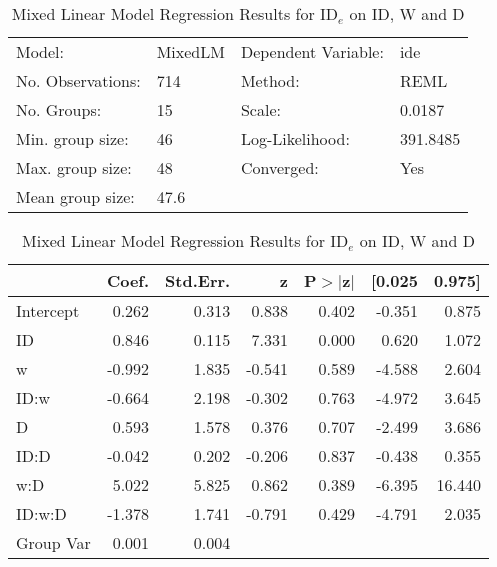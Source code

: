 \documentclass{article}
\begin{document}
\begin{table}
	\caption{Mixed Linear Model Regression Results for ID$_e$ on ID, W and D}
	\label{tab:fit_jgp_ide_id_full}
	\begin{center}
		\begin{tabular}{llll}
			\hline
			Model:            & MixedLM & Dependent Variable: & ide       \\
			No. Observations: & 714     & Method:             & REML      \\
			No. Groups:       & 15      & Scale:              & 0.0187    \\
			Min. group size:  & 46      & Log-Likelihood:     & 391.8485  \\
			Max. group size:  & 48      & Converged:          & Yes       \\
			Mean group size:  & 47.6    &                     &           \\
			\hline
			\end{tabular}
			\end{center}
			
			\begin{center}
			\begin{tabular}{lrrrrrr}
			\hline
					  &  Coef. & Std.Err. &      z & P$> |$z$|$ & [0.025 & 0.975]  \\
			\hline
			Intercept &  0.262 &    0.313 &  0.838 &       0.402 & -0.351 &  0.875  \\
			ID        &  0.846 &    0.115 &  7.331 &       0.000 &  0.620 &  1.072  \\
			w         & -0.992 &    1.835 & -0.541 &       0.589 & -4.588 &  2.604  \\
			ID:w      & -0.664 &    2.198 & -0.302 &       0.763 & -4.972 &  3.645  \\
			D         &  0.593 &    1.578 &  0.376 &       0.707 & -2.499 &  3.686  \\
			ID:D      & -0.042 &    0.202 & -0.206 &       0.837 & -0.438 &  0.355  \\
			w:D       &  5.022 &    5.825 &  0.862 &       0.389 & -6.395 & 16.440  \\
			ID:w:D    & -1.378 &    1.741 & -0.791 &       0.429 & -4.791 &  2.035  \\
			Group Var &  0.001 &    0.004 &        &             &        &         \\
			\hline
			\end{tabular}
			\end{center}
			\end{table}
\end{document}
